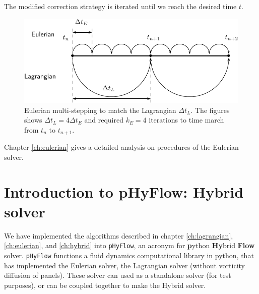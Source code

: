 The modified correction strategy is iterated until we reach the desired time $t$.

	\begin{figure}[!t]
	\centering
	\includegraphics[width=0.7\linewidth]{./figures/eulerian/multiStep-crop.pdf}
	\caption{Eulerian multi-stepping to match the Lagrangian $\Delta t_L$. The figures shows $\Delta t_L = 4 \Delta t_E$ and required $k_E = 4$ iterations to time march from $t_n$ to $t_{n+1}$.}
	\label{fig:multiStep}
	\end{figure}


Chapter \ref{ch:eulerian} gives a detailed analysis on procedures of the Eulerian solver.

\section{Introduction to pHyFlow: Hybrid solver}

We have implemented the algorithms described in chapter \ref{ch:lagrangian}, \ref{ch:eulerian}, and \ref{ch:hybrid} into \texttt{pHyFlow}, an acronym for  \textbf{p}ython \textbf{Hy}brid \textbf{Flow} solver. \texttt{pHyFlow} functions a fluid dynamics computational library in python, that has implemented the Eulerian solver, the Lagrangian solver (without vorticity diffusion of panels). These solver can used as a standalone solver (for test purposes), or can be coupled together to make the Hybrid solver. 

